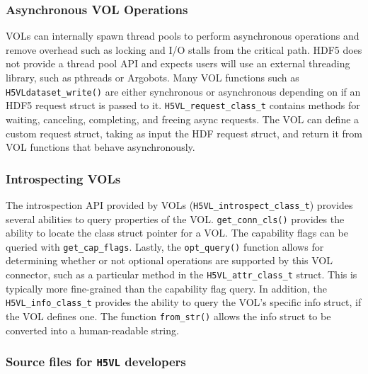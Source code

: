 \subsubsection{Asynchronous VOL Operations}

VOLs can internally spawn thread pools to perform asynchronous operations and remove overhead such as locking and I/O stalls from the critical path. HDF5 does not provide a thread pool API and expects users will use an external threading library, such as pthreads or Argobots. Many VOL functions such as \texttt{H5VLdataset\_write()} are either synchronous or asynchronous depending on if an HDF5 request struct is passed to it. \texttt{H5VL\_request\_class\_t} contains methods for waiting, canceling, completing, and freeing async requests. The VOL can define a custom request struct, taking as input the HDF request struct, and return it from VOL functions that behave asynchronously.

\subsubsection{Introspecting VOLs}

The introspection API provided by VOLs (\texttt{H5VL\_introspect\_class\_t}) provides several abilities to query properties of the VOL. \texttt{get\_conn\_cls()} provides the ability to locate the class struct pointer for a VOL. The capability flags can be queried with \texttt{get\_cap\_flags}. Lastly, the \texttt{opt\_query()} function allows for determining whether or not optional operations are supported by this VOL connector, such as a particular method in the \texttt{H5VL\_attr\_class\_t} struct. This is typically more fine-grained than the capability flag query. In addition, the \texttt{H5VL\_info\_class\_t} provides the ability to query the VOL's specific info struct, if the VOL defines one. The function \texttt{from\_str()} allows the info struct to be converted into a human-readable string.

\subsubsection{Source files for \texttt{H5VL} developers}

